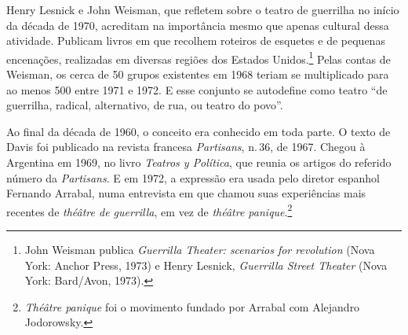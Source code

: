
Henry Lesnick e John Weisman, que refletem sobre o teatro de guerrilha
no início da década de 1970, acreditam na importância mesmo que
apenas cultural dessa atividade. Publicam livros em que recolhem
roteiros de esquetes e de pequenas encenações, realizadas em diversas
regiões dos Estados Unidos.\footnote{John Weisman publica {\it Guerrilla
  Theater: scenarios for revolution} (Nova York: Anchor Press, 1973) e
  Henry Lesnick, {\it Guerrilla Street Theater} (Nova York: Bard/Avon,
  1973).} Pelas contas de Weisman, os cerca de 50 grupos existentes em
1968 teriam se multiplicado para ao menos 500 entre 1971 e 1972. E esse
conjunto se autodefine como teatro “de guerrilha, radical, alternativo,
de rua, ou teatro do povo”.

Ao final da década de 1960, o conceito era conhecido em toda parte. O
texto de Davis foi publicado na revista francesa {\it Partisans}, n.\,36,
de 1967. Chegou à Argentina em 1969, no livro {\it Teatros y Política},
que reunia os artigos do referido número da {\it Partisans}. E em 1972,
a expressão era usada pelo diretor espanhol Fernando Arrabal, numa
entrevista em que chamou suas experiências mais recentes de {\it théâtre
de guerrilla}, em vez de {\it théâtre panique}.\footnote{{\it Théâtre
  panique} foi o movimento fundado por Arrabal com Alejandro Jodorowsky.}

